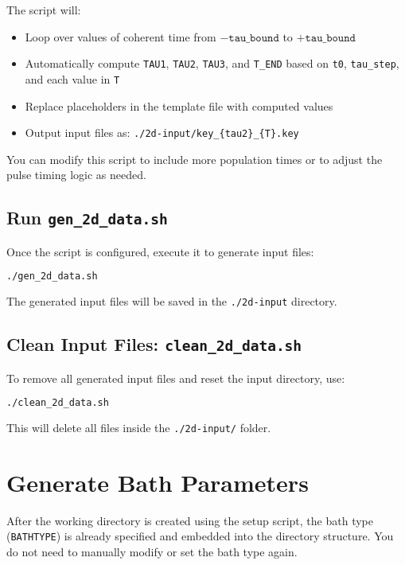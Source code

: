 \documentclass{article}
\begin{document}
The script will:

\begin{itemize}
    \item Loop over values of coherent time from \(-\texttt{tau\_bound}\) to \(+\texttt{tau\_bound}\)
    \item Automatically compute \texttt{TAU1}, \texttt{TAU2}, \texttt{TAU3}, and \texttt{T\_END} based on \texttt{t0}, \texttt{tau\_step}, and each value in \texttt{T}
    \item Replace placeholders in the template file with computed values
    \item Output input files as: \texttt{./2d-input/key\_\{tau2\}\_\{T\}.key}
\end{itemize}

You can modify this script to include more population times or to adjust the pulse timing logic as needed.

\subsection*{Run \texttt{gen\_2d\_data.sh}}

Once the script is configured, execute it to generate input files:

\begin{lstlisting}[language=bash]
./gen_2d_data.sh
\end{lstlisting}

The generated input files will be saved in the \texttt{./2d-input} directory.

\subsection*{Clean Input Files: \texttt{clean\_2d\_data.sh}}

To remove all generated input files and reset the input directory, use:

\begin{lstlisting}[language=bash]
./clean_2d_data.sh
\end{lstlisting}

This will delete all files inside the \texttt{./2d-input/} folder.

\newpage

\section{Generate Bath Parameters}

After the working directory is created using the setup script, the bath type (\texttt{BATHTYPE}) is already specified and embedded into the directory structure. You do not need to manually modify or set the bath type again.
\end{document}
